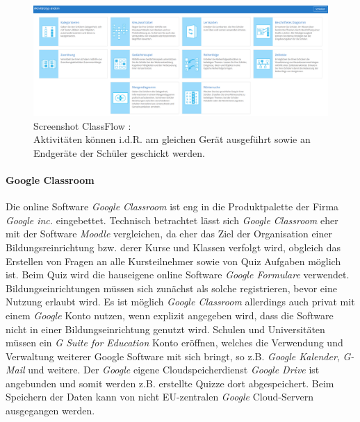 \begin{figure}[H]
	\centering
	\includegraphics[width=\linewidth]{bilder/screenshot_classflow}
	\caption[Screenshot ClassFlow]{Screenshot ClassFlow \cite{PrometheanLimeted2019}:\\ Aktivitäten können i.d.R. am gleichen Gerät ausgeführt sowie an Endgeräte der Schüler geschickt werden.}
	\label{fig:classflow}
\end{figure}

\paragraph{Google Classroom}
Die online Software \emph{Google Classroom} ist eng in die Produktpalette der Firma \emph{Google inc.} eingebettet. Technisch betrachtet lässt sich \emph{Google Classroom} eher mit der Software \emph{Moodle} vergleichen, da eher das Ziel der Organisation einer Bildungsreinrichtung bzw. derer Kurse und Klassen verfolgt wird, obgleich das Erstellen von Fragen an alle Kursteilnehmer sowie von Quiz Aufgaben möglich ist. Beim Quiz wird die hauseigene online Software \emph{Google Formulare} verwendet. Bildungseinrichtungen müssen sich zunächst als solche registrieren, bevor eine Nutzung erlaubt wird. Es ist möglich \emph{Google Classroom} allerdings auch privat mit einem \emph{Google} Konto nutzen, wenn explizit angegeben wird, dass die Software nicht in einer Bildungseinrichtung genutzt wird. Schulen und Universitäten müssen ein \emph{G Suite for Education} Konto eröffnen, welches die Verwendung und Verwaltung weiterer Google Software mit sich bringt, so z.B. \emph{Google Kalender},\emph{ G-Mail} und weitere. Der \emph{Google} eigene Cloudspeicherdienst \emph{Google Drive} ist angebunden und somit werden z.B. erstellte Quizze dort abgespeichert. Beim Speichern der Daten kann von nicht EU-zentralen \emph{Google} Cloud-Servern ausgegangen werden. 

